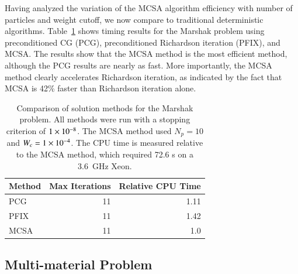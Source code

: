 \documentclass[preprint,12pt]{elsarticle}
\begin{document}
Having analyzed the variation of the MCSA algorithm efficiency with number of
particles and weight cutoff, we now compare to traditional deterministic
algorithms.  Table~\ref{tab:marshak_comparison} shows timing results for the
Marshak problem using preconditioned CG (PCG), preconditioned Richardson
iteration (PFIX), and MCSA. The results show that the MCSA method is the most
efficient method, although the PCG results are nearly as fast.  More
importantly, the MCSA method clearly accelerates Richardson iteration, as
indicated by the fact that MCSA is 42\% faster than Richardson iteration
alone.
\begin{table}[h!]
  \begin{center}
    \begin{tabular}{lrr}\hline\hline
      \multicolumn{1}{c}{Method} & \multicolumn{1}{c}{Max Iterations}
      & \multicolumn{1}{c}{Relative CPU Time}\\\hline\hline  PCG &
      11 & 1.11 \\  PFIX & 11 & 1.42 \\  MCSA & 11 & 1.0
      \\ \hline\hline
    \end{tabular}
  \end{center}
  \caption{Comparison of solution methods for the Marshak problem. All
    methods were run with a stopping criterion of $1\times 10^{-8}$.  The
    MCSA method used $N_p=10$ and $W_c = 1\times 10^{-4}$.  The CPU time is
    measured relative to the MCSA method, which required 72.6 s on a
    3.6~GHz Xeon.}
  \label{tab:marshak_comparison}
\end{table}

\subsection{Multi-material Problem}
\end{document}
